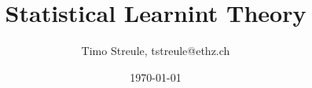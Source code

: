 \documentclass[%
    ,a4paper
    ,fontsize=12pt %
    ,landscape
    ,pagesize
    ,headinclude
    ]{scrartcl}
\title{Statistical Learnint Theory}
\author{Timo Streule, tstreule@ethz.ch}
\date{\today}
\begin{document}
    

    \begin{multicols*}{3}


        \maketitle

        
        
        
        
        
        
        
        
        

        

    \end{multicols*}
\end{document}
